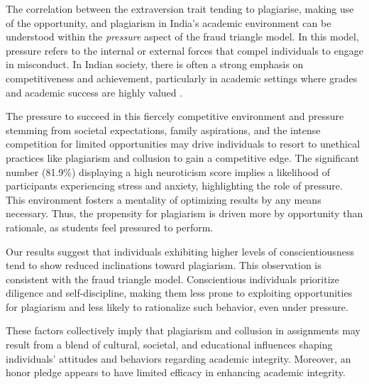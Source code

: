 The correlation between the extraversion trait tending to plagiarise, making use of the opportunity, and plagiarism in India's academic environment can be understood within the \textit{pressure} aspect of the fraud triangle model. In this model, pressure refers to the internal or external forces that compel individuals to engage in misconduct. In Indian society, there is often a strong emphasis on competitiveness and achievement, particularly in academic settings where grades and academic success are highly valued \cite{IITPrepMenace,UnemploymentIndia, NAIR2020831}. %

The pressure to succeed in this fiercely competitive environment and pressure stemming from societal expectations, family aspirations, and the intense competition for limited opportunities may drive individuals to resort to unethical practices like plagiarism and collusion to gain a competitive edge. The significant number (81.9\%) displaying a high neuroticism score implies a likelihood of participants experiencing stress and anxiety, highlighting the role of pressure. This environment fosters a mentality of optimizing results by any means necessary. Thus, the propensity for plagiarism is driven more by opportunity than rationale, as students feel pressured to perform. 

Our results suggest that individuals exhibiting higher levels of conscientiousness tend to show reduced inclinations toward plagiarism. This observation is consistent with the fraud triangle model. Conscientious individuals prioritize diligence and self-discipline, making them less prone to exploiting opportunities for plagiarism and less likely to rationalize such behavior, even under pressure.

These factors collectively imply that plagiarism and collusion in assignments may result from a blend of cultural, societal, and educational influences shaping individuals' attitudes and behaviors regarding academic integrity. Moreover, an honor pledge appears to have limited efficacy in enhancing academic integrity.
\vspace{-4pt}